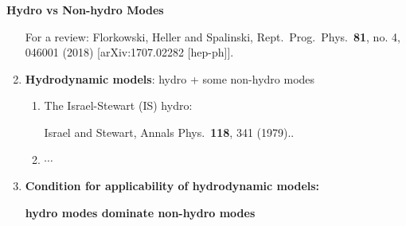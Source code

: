 \documentclass[9pt,a4paper,unknownkeysallowed,xcolor=dvipsnames,aspectratio=43]{beamer}
\begin{document}
\begin{frame}{\bf\huge Hydro vs Non-hydro Modes}
\begin{enumerate}
\begin{center}
{\tiny  For a review: {\color{teablue}
  Florkowski, Heller and Spalinski,
  Rept.\ Prog.\ Phys.\  {\bf 81}, no. 4, 046001 (2018)
  [arXiv:1707.02282 [hep-ph]].
  }}
\end{center}
\item{\large{\bf Hydrodynamic models}: hydro + some non-hydro modes}
\vspace{2mm}
\begin{enumerate}
    \item{\large The Israel-Stewart (IS) hydro:}
    \begin{center}
    {\tiny {\color{teablue}
    Israel and Stewart,
  Annals Phys.\  {\bf 118}, 341 (1979)..
    }}
\end{center}
\item{$\cdots$}
\end{enumerate}
\item{\large \bf Condition for applicability of hydrodynamic models:}\\
\begin{center}
   {\bf \color{darkred} hydro modes dominate non-hydro modes}
\end{center}
\end{enumerate}
\end{frame}
\end{document}
